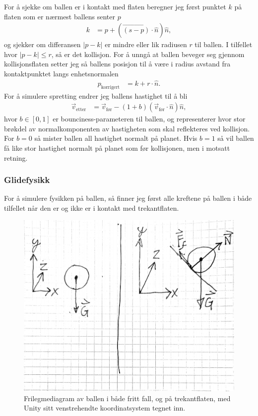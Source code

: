 \documentclass[norsk, doc, 12pt, a4paper]{apa7}  %
\begin{document}
For å sjekke om ballen er i kontakt med flaten beregner jeg først punktet \(k\) på flaten som er nærmest ballens senter \(p\)
\begin{align*}
	k &= p + \left(\vec{(s-p)}\cdot\hat{n}\right)\hat{n},
\end{align*}
og sjekker om differansen \(|p - k|\) er mindre eller lik radiusen \(r\) til ballen. I tilfellet hvor \(|p-k|\leq r\), så er det kollisjon. For å unngå at ballen beveger seg gjennom kollisjonsflaten setter jeg så ballens posisjon til å være i radius avstand fra kontaktpunktet langs enhetsnormalen
\begin{align*}
	p_{\text{korrigert}} &= k + r\cdot\hat{n}.
\end{align*}
For å simulere spretting endrer jeg ballens hastighet til å bli
\begin{align*}
	\vec{v}_{\text{etter}} &= \vec{v}_{\text{før}} - \left(1+b\right)\left(\vec{v}_{\text{før}}\cdot\hat{n}\right)\hat{n},
\end{align*}
hvor \(b\in [0,1]\) er bounciness-parameteren til ballen, og representerer hvor stor brøkdel av normalkomponenten av hastigheten som skal reflekteres ved kollisjon. For \(b = 0\) så mister ballen all hastighet normalt på planet. Hvis \(b=1\) så vil ballen få like stor hastighet normalt på planet som før kollisjonen, men i motsatt retning.

\subsubsection{Glidefysikk}
For å simulere fysikken på ballen, så finner jeg først alle kreftene på ballen i både tilfellet når den er og ikke er i kontakt med trekantflaten.
\begin{figure}[H]
	\centering
	\label{fig:frilegmediagram}
	\includegraphics[scale=0.25]{figs/frilegmediagram.pdf}
	\caption{Frilegmediagram av ballen i både fritt fall, og på trekantflaten, med Unity sitt venstrehendte koordinatsystem tegnet inn.}
\end{figure}
\end{document}
